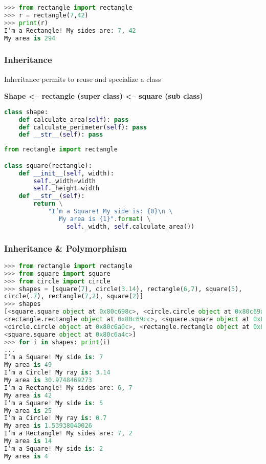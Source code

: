 \begin{lstlisting}[language=Python]
>>> from rectangle import rectangle
>>> r = rectangle(7,42)
>>> print(r)
I’m a Rectangle! My sides are: 7, 42
My area is 294
\end{lstlisting}

\subsubsection{Inheritance}

Inheritance permits to reuse and specialize a class

\textbf{Shape <-- rectangle (super class) <-- square (sub class)}

\begin{lstlisting}[language=Python]
class shape:
	def calculate_area(self): pass
	def calculate_perimeter(self): pass
	def __str__(self): pass
\end{lstlisting}

\begin{lstlisting}[language=Python]
from rectangle import rectangle

class square(rectangle):
	def __init__(self, width):
		self._width=width
		self._height=width
	def __str__(self):
		return \
			"I’m a Square! My side is: {0}\n \
			   My area is {1}".format( \
	             self._width, self.calculate_area())
\end{lstlisting}

\subsubsection{Inheritance & Polymorphism}

\begin{lstlisting}[language=Python]
>>> from rectangle import rectangle
>>> from square import square
>>> from circle import circle
>>> shapes = [square(7), circle(3.14), rectangle(6,7), square(5),
circle(.7), rectangle(7,2), square(2)]
>>> shapes
[<square.square object at 0x80c698c>, <circle.circle object at 0x80c69ac>,
<rectangle.rectangle object at 0x80c69cc>, <square.square object at 0x80c69ec>,
<circle.circle object at 0x80c6a0c>, <rectangle.rectangle object at 0x80c6a2c>,
<square.square object at 0x80c6a4c>]
>>> for i in shapes: print(i)
...
I’m a Square! My side is: 7
My area is 49
I’m a Circle! My ray is: 3.14
My area is 30.9748469273
I’m a Rectangle! My sides are: 6, 7
My area is 42
I’m a Square! My side is: 5
My area is 25
I’m a Circle! My ray is: 0.7
My area is 1.53938040026
I’m a Rectangle! My sides are: 7, 2
My area is 14
I’m a Square! My side is: 2
My area is 4
\end{lstlisting}

